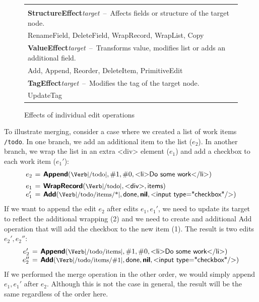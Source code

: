 \documentclass[sigconf,anonymous,screen]{acmart}
\newcommand{\ident}[1]{{\sffamily #1}}
\newcommand{\srcid}[1]{\textnormal{\sffamily #1}}
\newcommand{\srckvd}[1]{\textnormal{\sffamily\bfseries #1}}
\begin{document}
\begin{figure}
\newcommand{\eftablecol}[3]{
\small{\bfseries #1}\;\footnotesize\textit{target}\,\; --\,\; {\footnotesize #2}\\[-0.1em]
\quad \small #3\\[0.3em]
}
\begin{tabular}{|p{27em}|}
\hline
\\[-1em]
\eftablecol{StructureEffect}{Affects fields or structure of the target node.}
  {\ident{RenameField}, \ident{DeleteField}, \ident{WrapRecord}, \ident{WrapList}, \ident{Copy}}
\eftablecol{ValueEffect}{Transforms value, modifies list or adds an additional field.}
  {\ident{Add}, \ident{Append}, \ident{Reorder}, \ident{DeleteItem}, \ident{PrimitiveEdit}}
\eftablecol{TagEffect}{Modifies the tag of the target node.}
  {\ident{UpdateTag}}
\hline
\end{tabular}
\vspace{-0.5em}
\caption{Effects of individual edit operations}
\label{fig:effects}
\vspace{-1em}
\end{figure}


To illustrate merging, consider a case where we created a list of work items {\small\Verb|/todo|}.
In one branch, we add an additional item to the list ($e_2$). In another branch, we wrap the
list in an extra \ident{<div>} element ($e_1$) and add a checkbox to each work item ($e_1'$):
%
\begin{equation*}
\arraycolsep=2pt
\begin{array}{rcl}
e_2 &=& \srckvd{Append}(\textnormal{\small\Verb|/todo|}, \#1, \#0, \srcid{<li>Do some work</li>})\\[0.5em]
e_1 &=& \srckvd{WrapRecord}(\textnormal{\small\Verb|/todo|}, \srcid{<div>}, \srcid{items})\\
e_1' &=& \srckvd{Add}(\textnormal{\small\Verb|/todo/items/*|}, \srcid{done}, \srckvd{nil}, \srcid{<input type="checkbox"/>})\\
\end{array}
\end{equation*}
%
If we want to append the edit $e_2$ after edits $e_1, e_1'$, we need to update its target to
reflect the additional wrapping (2) and we need to create and additional \ident{Add} operation
that will add the checkbox to the new item (1). The result is two edits $e_2', e_2''$:
%
\begin{equation*}
\arraycolsep=2pt
\begin{array}{rcl}
e_2'  &=& \srckvd{Append}(\textnormal{\small\Verb|/todo/items|}, \#1, \#0, \srcid{<li>Do some work</li>})\\
e_2'' &=& \srckvd{Add}(\textnormal{\small\Verb|/todo/items/\#1|}, \srcid{done}, \srckvd{nil}, \srcid{<input type="checkbox"/>})\\
\end{array}
\end{equation*}
%
If we performed the merge operation in the other order, we would simply append $e_1, e_1'$ after
$e_2$. Although this is not the case in general, the result will be the same regardless of the order here.
\end{document}
